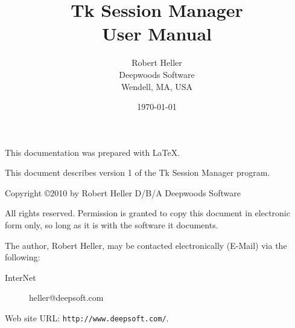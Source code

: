 \documentclass[12pt,notitlepage,twoside]{book}
\begin{document}
\title{Tk Session Manager \\ User Manual}
\author{Robert Heller \\ Deepwoods Software \\ Wendell, MA, USA}
\date{\today}
\begin{titlepage}

\maketitle

\clearpage


This documentation was prepared with \LaTeX.

This document describes version 1 of the Tk Session Manager program.

{\small Copyright \copyright 2010 by Robert Heller D/B/A Deepwoods Software}

\vspace{.25in}

All rights reserved.  Permission is granted to copy this document in
electronic form only, so long as it is with the software it
documents. 

The author, Robert Heller, may be contacted electronically (E-Mail) via
the following:

\begin{description}
\item[InterNet] heller@deepsoft.com
\end{description}

Web site URL: {\tt http://www.deepsoft.com/}.

\thispagestyle{empty}
\setcounter{page}{0}
\clearpage

\end{titlepage}


\tableofcontents
\listoffigures
\listoftables
\cleardoublepage
%       
%       

%
\cleardoublepage
{}
%





{\footnotesize
 
}
\cleardoublepage
\printindex
\end{document}
